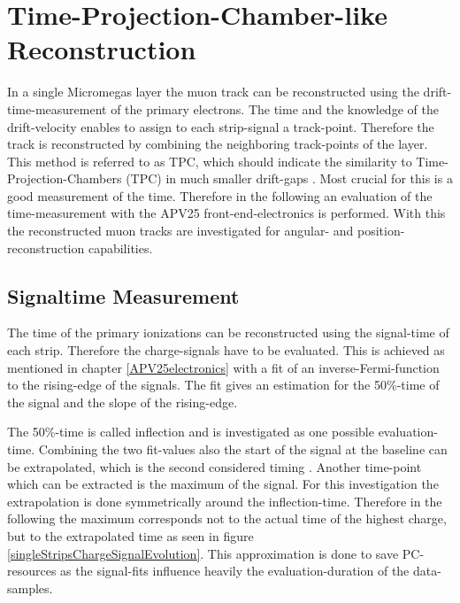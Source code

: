 \documentclass[
twoside,            %
BCOR1.4cm,          %
10pt,               %
headings=normal,    %
headsepline,        %
clearplainpage,		%
final,              %
div=14,
open=right,
bibliography=toc
]{scrreprt}
\begin{document}

\section{Time-Projection-Chamber-like Reconstruction}

In a single Micromegas layer the muon track can be reconstructed using the drift-time-measurement of the primary electrons.
The time and the knowledge of the drift-velocity enables to assign to each strip-signal a track-point.
Therefore the track is reconstructed by combining the neighboring track-points of the layer.
This method is referred to as \textmu TPC, which should indicate the similarity to Time-Projection-Chambers (TPC) in much smaller drift-gaps \cite{ntekasThesis}.
Most crucial for this is a good measurement of the time.
Therefore in the following an evaluation of the time-measurement with the APV25 front-end-electronics is performed.
With this the reconstructed muon tracks are investigated for angular- and position-reconstruction capabilities.

\subsection{Signaltime Measurement}\label{signalTimeMeasurment}

The time of the primary ionizations can be reconstructed using the signal-time of each strip.
Therefore the charge-signals have to be evaluated.
This is achieved as mentioned in chapter \ref{APV25electronics} with a fit of an inverse-Fermi-function to the rising-edge of the signals.
The fit gives an estimation for the 50\%-time of the signal and the slope of the rising-edge.

The 50\%-time is called inflection and is investigated as one possible evaluation-time.
Combining the two fit-values also the start of the signal at the baseline can be extrapolated, which is the second considered timing \cite{loeselMaster}.
Another time-point which can be extracted is the maximum of the signal.
For this investigation the extrapolation is done symmetrically around the inflection-time.
Therefore in the following the maximum corresponds not to the actual time of the highest charge, but to the extrapolated time as seen in figure \ref{singleStripsChargeSignalEvolution}.
This approximation is done to save PC-resources as the signal-fits influence heavily the evaluation-duration of the data-samples.
\end{document}
